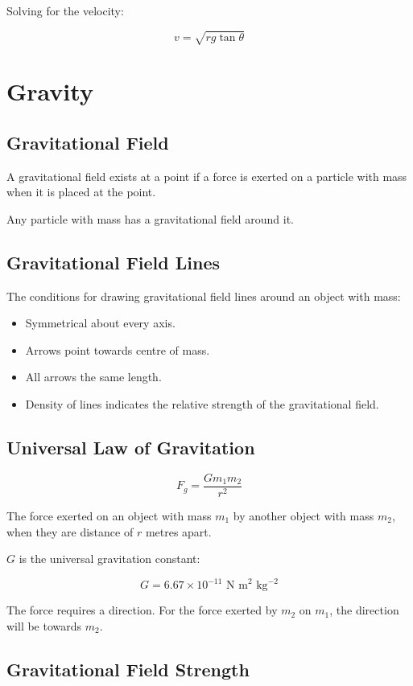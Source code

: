 \documentclass[a4paper,11pt]{article}
\begin{document}
Solving for the velocity:

$$
v = \sqrt{rg \tan{\theta}}
$$




\section{Gravity}

\subsection{Gravitational Field}

A gravitational field exists at a point if a force is exerted on a particle
with mass when it is placed at the point.

Any particle with mass has a gravitational field around it.


\subsection{Gravitational Field Lines}

The conditions for drawing gravitational field lines around an object with mass:

\begin{itemize}
\item Symmetrical about every axis.
\item Arrows point towards centre of mass.
\item All arrows the same length.
\item Density of lines indicates the relative strength of the gravitational
	field.
\end{itemize}


\subsection{Universal Law of Gravitation}

$$
F_g = \frac{G m_1 m_2}{r^2}
$$

The force exerted on an object with mass $m_1$ by another object with mass
$m_2$, when they are distance of $r$ metres apart.

$G$ is the universal gravitation constant:

$$
G = 6.67 \times 10^{-11}\mbox{ N m}^2\mbox{ kg}^{-2}
$$

The force requires a direction. For the force exerted by $m_2$ on $m_1$, the
direction will be towards $m_2$.


\subsection{Gravitational Field Strength}
\end{document}
